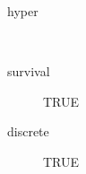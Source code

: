 \begin{description}
	\item[hyper]\ 
	 \item[ survival ] TRUE 
	 \item[ discrete ] TRUE 
\end{description}
